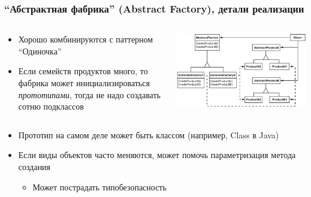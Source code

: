 \documentclass[xetex,mathserif,serif]{beamer}
\begin{document}
	\begin{frame}
		\frametitle{``Абстрактная фабрика'' (Abstract Factory), детали реализации}
		\begin{columns}
			\begin{column}{0.5\textwidth}
				\begin{itemize}
					\item Хорошо комбинируются с паттерном ``Одиночка''
					\item Если семейств продуктов много, то фабрика может инициализироваться \textit{прототипами}, тогда не надо создавать сотню подклассов
				\end{itemize}
			\end{column}
			\begin{column}{0.5\textwidth}
				\begin{center}
					\includegraphics[width=\textwidth]{abstractFactory.png}
				\end{center}
			\end{column}
		\end{columns}
		\begin{itemize}
			\item Прототип на самом деле может быть классом (например, Class в Java)
			\item Если виды объектов часто меняются, может помочь параметризация метода создания
			\begin{itemize}
				\item Может пострадать типобезопасность
			\end{itemize}
		\end{itemize}
	\end{frame}
\end{document}
